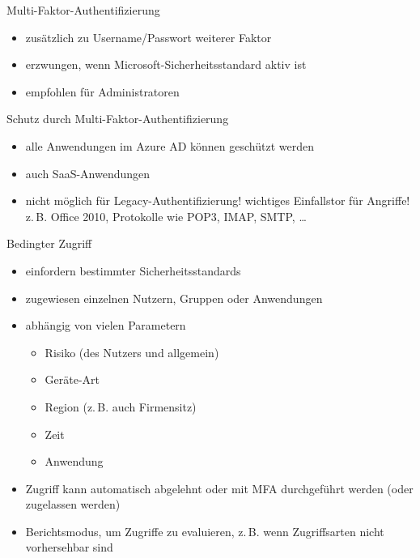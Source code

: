 
\begin{flashcard}[Definition]{Multi-Faktor-Authentifizierung}
  \begin{itemize}
    \item zusätzlich zu Username/Passwort weiterer Faktor
    \item erzwungen, wenn Microsoft-Sicherheitsstandard aktiv ist
    \item empfohlen für Administratoren
  \end{itemize}
\end{flashcard}

\begin{flashcard}[Definition]{Schutz durch Multi-Faktor-Authentifizierung}
  \begin{itemize}
    \item alle Anwendungen im Azure AD können geschützt werden
    \item auch SaaS-Anwendungen
    \item nicht möglich für Legacy-Authentifizierung!\newline
    wichtiges Einfallstor für Angriffe!\newline
    z.\,B. Office 2010, Protokolle wie POP3, IMAP, SMTP, \ldots
  \end{itemize}
\end{flashcard}

\begin{flashcard}[Definition]{Bedingter Zugriff}
  \begin{itemize}
    \item einfordern bestimmter Sicherheitsstandards
    \item zugewiesen einzelnen Nutzern, Gruppen oder Anwendungen
    \item abhängig von vielen Parametern
      \begin{itemize}
        \item Risiko (des Nutzers und allgemein)
        \item Geräte-Art
        \item Region (z.\,B. auch Firmensitz)
        \item Zeit
        \item Anwendung
      \end{itemize}
    \item Zugriff kann automatisch abgelehnt oder mit MFA durchgeführt werden\newline
      (oder zugelassen werden)
    \item Berichtsmodus, um Zugriffe zu evaluieren, z.\,B. wenn Zugriffsarten nicht vorhersehbar sind
  \end{itemize}
\end{flashcard}

